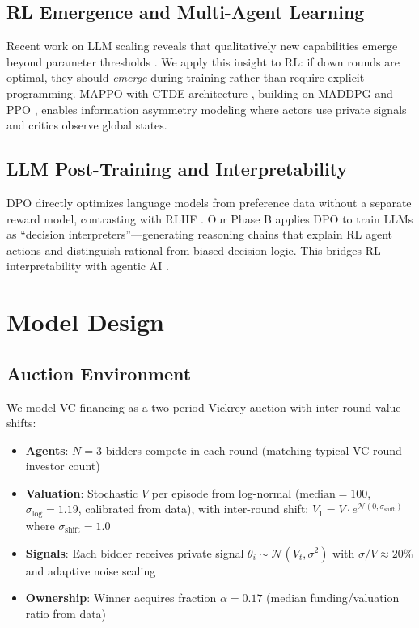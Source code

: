 \documentclass[11pt,a4paper]{article}
\begin{document}
\subsection{RL Emergence and Multi-Agent Learning}

Recent work on LLM scaling reveals that qualitatively new capabilities emerge beyond parameter thresholds \citep{wei2022}. We apply this insight to RL: if down rounds are optimal, they should \emph{emerge} during training rather than require explicit programming. MAPPO with CTDE architecture \citep{yu2021}, building on MADDPG \citep{lowe2017} and PPO \citep{schulman2017}, enables information asymmetry modeling where actors use private signals and critics observe global states.

\subsection{LLM Post-Training and Interpretability}

DPO \citep{rafailov2023} directly optimizes language models from preference data without a separate reward model, contrasting with RLHF \citep{outrihed2023,christiano2017}. Our Phase B applies DPO to train LLMs as ``decision interpreters''---generating reasoning chains that explain RL agent actions and distinguish rational from biased decision logic. This bridges RL interpretability with agentic AI \citep{wang2023}.

\section{Model Design}

\subsection{Auction Environment}

We model VC financing as a two-period Vickrey auction with inter-round value shifts:

\begin{itemize}[nosep]
  \item \textbf{Agents}: $N=3$ bidders compete in each round (matching typical VC round investor count)
  \item \textbf{Valuation}: Stochastic $V$ per episode from log-normal ($\text{median}=100$, $\sigma_{\log}=1.19$, calibrated from data), with inter-round shift: $V_1 = V \cdot e^{\mathcal{N}(0, \sigma_{\text{shift}})}$ where $\sigma_{\text{shift}}=1.0$
  \item \textbf{Signals}: Each bidder receives private signal $\theta_i \sim \mathcal{N}(V_t, \sigma^2)$ with $\sigma/V \approx 20\%$ and adaptive noise scaling
  \item \textbf{Ownership}: Winner acquires fraction $\alpha = 0.17$ (median funding/valuation ratio from data)
\end{itemize}
\end{document}
